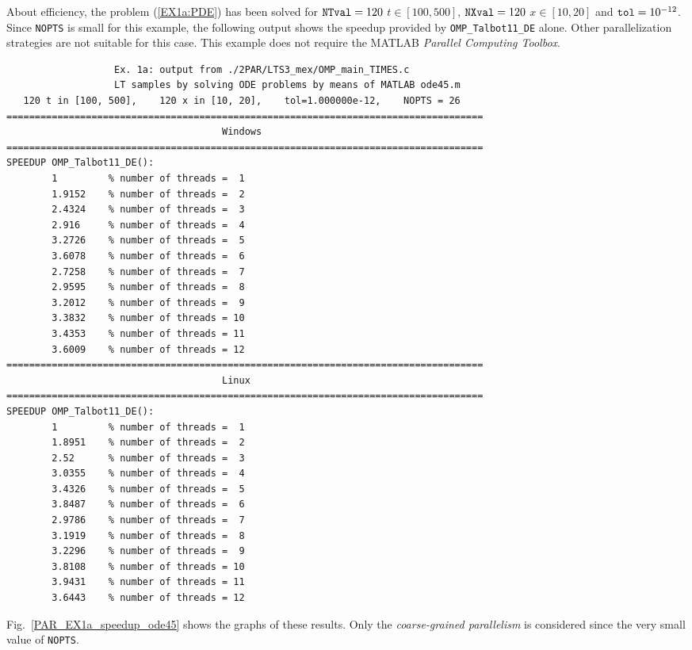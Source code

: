 \documentclass[a4paper,10pt]{report}%
\begin{document}
About efficiency, the problem (\ref{EX1a:PDE}) has been solved for ${\tt NTval}=120$ $t\in[100,500]$, ${\tt NXval}=120$
$x\in[10,20]$ and ${\tt tol}=10^{-12}$. Since {\tt NOPTS} is small for this example, the following output shows
the speedup provided by {\tt OMP\_Talbot11\_DE} alone. Other parallelization strategies are not suitable for this
case. This example does not require the MATLAB {\em Parallel Computing Toolbox}.
\begin{lstlisting}
                   Ex. 1a: output from ./2PAR/LTS3_mex/OMP_main_TIMES.c
                   LT samples by solving ODE problems by means of MATLAB ode45.m
   120 t in [100, 500],    120 x in [10, 20],    tol=1.000000e-12,    NOPTS = 26
====================================================================================
                                      Windows
====================================================================================
SPEEDUP OMP_Talbot11_DE():
        1         % number of threads =  1
        1.9152    % number of threads =  2
        2.4324    % number of threads =  3
        2.916     % number of threads =  4
        3.2726    % number of threads =  5
        3.6078    % number of threads =  6
        2.7258    % number of threads =  7
        2.9595    % number of threads =  8
        3.2012    % number of threads =  9
        3.3832    % number of threads = 10
        3.4353    % number of threads = 11
        3.6009    % number of threads = 12
====================================================================================
                                      Linux
====================================================================================
SPEEDUP OMP_Talbot11_DE():
        1         % number of threads =  1
        1.8951    % number of threads =  2
        2.52      % number of threads =  3
        3.0355    % number of threads =  4
        3.4326    % number of threads =  5
        3.8487    % number of threads =  6
        2.9786    % number of threads =  7
        3.1919    % number of threads =  8
        3.2296    % number of threads =  9
        3.8108    % number of threads = 10
        3.9431    % number of threads = 11
        3.6443    % number of threads = 12
\end{lstlisting}
Fig.~\ref{PAR_EX1a_speedup_ode45} shows the graphs of these results.
Only the {\em coarse-grained parallelism} is considered since the very small value of {\tt NOPTS}.
\end{document}
